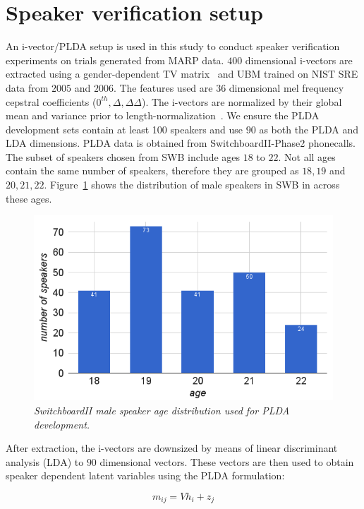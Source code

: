 \documentclass[a4paper]{article}
\begin{document}
\section{Speaker verification setup}
\label{sec:sid}
An i-vector/PLDA setup is used in this study to conduct speaker verification experiments on trials generated from MARP data. $400$ dimensional i-vectors are extracted using a gender-dependent TV matrix~\cite{dehak2011front} and UBM trained on NIST SRE data from $2005$ and $2006$. The features used are 36 dimensional mel frequency cepstral coefficients ($0^{th},\Delta, \Delta\Delta$). The i-vectors are normalized by their global mean and variance prior to length-normalization~\cite{garcia2011analysis}. We ensure the PLDA development sets contain at least 100 speakers and use $90$ as both the PLDA and LDA dimensions. PLDA data is obtained from SwitchboardII-Phase2 phonecalls. The subset of speakers chosen from SWB include ages $18$ to $22$. Not all ages contain the same number of speakers, therefore they are grouped as $18,19$ and $20,21,22$. Figure~\ref{fig:swb2_male_hist} shows the distribution of male speakers in SWB in across these ages. 

\begin{figure}[h!]
\centering
\includegraphics[width=\linewidth]{figures//swb2_age_hist}
\caption{{\it SwitchboardII male speaker age distribution used for PLDA development.}}
\label{fig:swb2_male_hist}
\end{figure}

After extraction, the i-vectors are downsized by means of linear discriminant analysis (LDA) to $90$ dimensional vectors. These vectors are then used to obtain speaker dependent latent variables using the PLDA formulation: 

\begin{equation}
\label{eq:plda}
m_{ij} = Vh_i + z_j
\end{equation}
\end{document}
